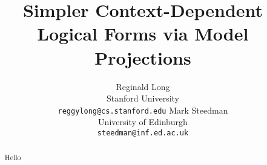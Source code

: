 \documentclass[11pt]{article}
\title{Simpler Context-Dependent Logical Forms via Model Projections}
\author{
  Reginald Long \\
  Stanford University \\
  {\small \tt{reggylong@cs.stanford.edu}}
\And
  Mark Steedman \\
  University of Edinburgh \\
  {\small \tt{steedman@inf.ed.ac.uk}}
}
\date{}
\begin{document}
\maketitle

\begin{abstract}
  Hello
\end{abstract}


%
%




\end{document}
